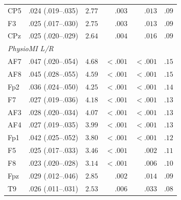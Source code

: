 \begin{table}[ht]
\begin{tabular}{llrrrr}
CP5 & .024 (.019--.035) & $2.77$ & $.003$ & $.013$ & $.09$ \\
F3 & .025 (.017--.030) & $2.75$ & $.003$ & $.013$ & $.09$ \\
CPz & .025 (.020--.029) & $2.64$ & $.004$ & $.016$ & $.09$ \\
\midrule \multicolumn{6}{l}{\textit{PhysioMI L/R}} \\
AF7 & .047 (.020--.054) & $4.68$ & $< .001$ & $< .001$ & $.15$ \\
AF8 & .045 (.028--.055) & $4.59$ & $< .001$ & $< .001$ & $.15$ \\
Fp2 & .036 (.024--.050) & $4.25$ & $< .001$ & $< .001$ & $.14$ \\
F7 & .027 (.019--.036) & $4.18$ & $< .001$ & $< .001$ & $.13$ \\
AF3 & .028 (.020--.034) & $4.07$ & $< .001$ & $< .001$ & $.13$ \\
AF4 & .027 (.019--.035) & $3.99$ & $< .001$ & $< .001$ & $.13$ \\
Fp1 & .042 (.025--.052) & $3.80$ & $< .001$ & $< .001$ & $.12$ \\
F5 & .025 (.017--.033) & $3.46$ & $< .001$ & $.002$ & $.11$ \\
F8 & .023 (.020--.028) & $3.14$ & $< .001$ & $.006$ & $.10$ \\
Fpz & .029 (.012--.046) & $2.85$ & $.002$ & $.014$ & $.09$ \\
T9 & .026 (.011--.031) & $2.53$ & $.006$ & $.033$ & $.08$ \\
\bottomrule
\end{tabular}
\end{table}
